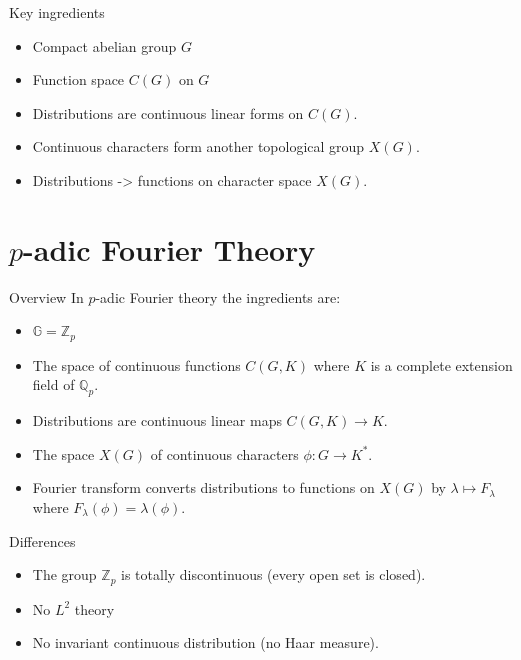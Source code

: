\documentclass[
  ignorenonframetext,
]{beamer}
\providecommand{\tightlist}{%
  \setlength{\itemsep}{0pt}\setlength{\parskip}{0pt}}
\begin{document}
\begin{frame}{Key ingredients}
\protect\hypertarget{key-ingredients}{}
\begin{itemize}
\tightlist
\item
  Compact abelian group \(G\)
\item
  Function space \(C(G)\) on \(G\)
\item
  Distributions are continuous linear forms on \(C(G)\).
\item
  Continuous characters form another topological group \(X(G)\).
\item
  Distributions -\textgreater{} functions on character space \(X(G)\).
\end{itemize}
\end{frame}

\hypertarget{p-adic-fourier-theory}{%
\section{\texorpdfstring{\(p\)-adic Fourier
Theory}{p-adic Fourier Theory}}\label{p-adic-fourier-theory}}

\begin{frame}{Overview}
\protect\hypertarget{overview-1}{}
In \(p\)-adic Fourier theory the ingredients are:

\begin{itemize}
\tightlist
\item
  \(\mathbb{G}=\mathbb{Z}_{p}\)
\item
  The space of continuous functions \(C(G,K)\) where \(K\) is a complete
  extension field of \(\mathbb{Q}_{p}\).
\item
  Distributions are continuous linear maps \(C(G,K)\to K\).
\item
  The space \(X(G)\) of continuous characters \(\phi: G\to K^{*}\).
\item
  Fourier transform converts distributions to functions on \(X(G)\) by
  \(\lambda \mapsto F_{\lambda}\) where
  \(F_{\lambda}(\phi)=\lambda(\phi)\).
\end{itemize}
\end{frame}

\begin{frame}{Differences}
\protect\hypertarget{differences}{}
\begin{itemize}
\item
  The group \(\mathbb{Z}_p\) is totally discontinuous (every open set is
  closed).
\item
  No \(L^{2}\) theory
\item
  No invariant continuous distribution (no Haar measure).
\end{itemize}
\end{frame}
\end{document}
